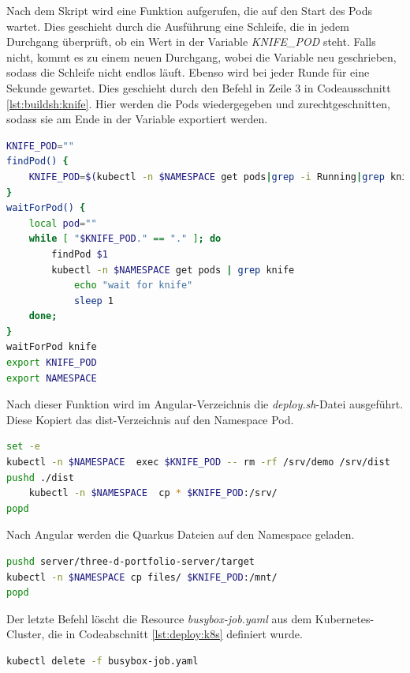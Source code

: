 Nach dem Skript wird eine Funktion aufgerufen, die auf den Start des Pods wartet. 
Dies geschieht durch die Ausführung eine Schleife, die in jedem Durchgang überprüft, ob ein Wert in der Variable \emph{KNIFE\_POD} steht.
Falls nicht, kommt es zu einem neuen Durchgang, wobei die Variable neu geschrieben, sodass die Schleife nicht endlos läuft. 
Ebenso wird bei jeder Runde für eine Sekunde gewartet.
Dies geschieht durch den Befehl in Zeile 3 in Codeausschnitt \ref{lst:buildsh:knife}. 
Hier werden die Pods wiedergegeben und zurechtgeschnitten, sodass sie am Ende in der Variable exportiert werden.  

\begin{lstlisting}[label=lst:buildsh:knife, language=bash, caption=Knife-Funktion in der build.sh-Datei]
KNIFE_POD=""
findPod() {
    KNIFE_POD=$(kubectl -n $NAMESPACE get pods|grep -i Running|grep knife|cut -d\  -f 1)
}
waitForPod() {
    local pod=""
    while [ "$KNIFE_POD." == "." ]; do
        findPod $1
        kubectl -n $NAMESPACE get pods | grep knife
            echo "wait for knife"
            sleep 1
    done;
}
waitForPod knife
export KNIFE_POD
export NAMESPACE
\end{lstlisting}

Nach dieser Funktion wird im Angular-Verzeichnis die \emph{deploy.sh}-Datei ausgeführt. 
Diese Kopiert das dist-Verzeichnis auf den Namespace Pod. 

\begin{lstlisting}[label=lst:deploy:angular, language=bash, caption=deploy.sh-Datei für Angular]
set -e
kubectl -n $NAMESPACE  exec $KNIFE_POD -- rm -rf /srv/demo /srv/dist
pushd ./dist
    kubectl -n $NAMESPACE  cp * $KNIFE_POD:/srv/
popd
\end{lstlisting}

Nach Angular werden die Quarkus Dateien auf den Namespace geladen.

\begin{lstlisting}[label=lst:deploy:angular, language=bash, caption=Kopieren der Datei für Quarkus]
pushd server/three-d-portfolio-server/target
kubectl -n $NAMESPACE cp files/ $KNIFE_POD:/mnt/
popd
\end{lstlisting}

Der letzte Befehl löscht die Resource \emph{busybox-job.yaml} aus dem Kubernetes-Cluster, die in Codeabschnitt \ref{lst:deploy:k8s} definiert wurde. 

\begin{lstlisting}[label=lst:deploy:angular, language=bash, caption=letzter Befehl der build.sh-Datei]
kubectl delete -f busybox-job.yaml
\end{lstlisting}